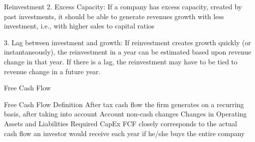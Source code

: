 \documentclass[10pt]{article}
\begin{document}
\begin{core}{Reinvestment}
      2. Excess Capacity: If a company has excess capacity, created by past investments, it should be able to generate revenues growth with less investment, i.e., with higher sales to capital ratios

      3. Lag between investment and growth: If reinvestment creates growth quickly (or instantaneously), the reinvestment in a year can be estimated based upon revenue change in that year. If there is a lag, the reinvestment may have to be tied to revenue change in a future year.

    \end{core}

    \begin{core}{Free Cash Flow}

      Free Cash Flow Definition
      After tax cash flow the firm generates on a recurring basis, after taking into account
      Account non-cash changes
      Changes in Operating Assets and Liabilities
      Required CapEx
      FCF closely corresponds to the actual cash flow an investor would receive each year if he/she buys the entire company

    \end{core}
\end{document}
